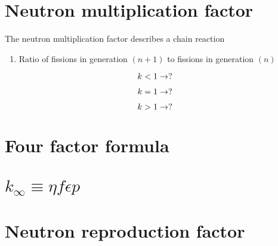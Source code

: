 \documentclass[aspectratio=1610,pdftex,dvipsnames,compress,xcolor={dvipsnames}]{beamer}
\begin{document}
\section{Neutron multiplication factor}


\addtocounter{framenumber}{-1} 
\begin{frame}{The neutron multiplication factor describes a chain reaction}
    \begin{enumerate}[series=outerlist,topsep=0pt,itemsep=21pt,leftmargin=*,label=(\arabic*)]
        \item[]Ratio of fissions in generation $(n+1)$ to fissions in generation $(n)$
    \end{enumerate}

    \vspace*{\fill}

    \begin{equation}
        \LARGE
        k < 1 \rightarrow ?
    \end{equation}

    \begin{equation}
        \LARGE
        k = 1 \rightarrow ?
    \end{equation}

    \begin{equation}
        \LARGE
        k > 1 \rightarrow ?
    \end{equation}
\end{frame}


\section{Four factor formula}
\section{$k_\infty \equiv \eta f \epsilon p$}
\section{Neutron reproduction factor}
\end{document}
